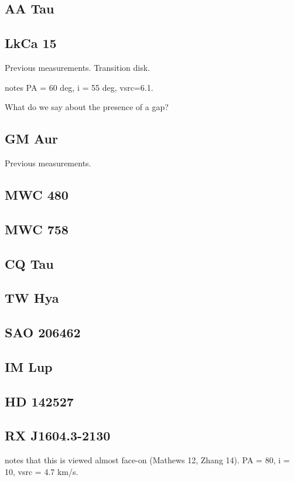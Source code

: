 \documentclass[twocolumn]{aastex6}
\begin{document}
\subsection{AA Tau}

\subsection{LkCa 15}
Previous measurements. Transition disk.

\citep{vandermarel15} notes PA = 60 deg, i = 55 deg,  vsrc=6.1.

What do we say about the presence of a gap?

\subsection{GM Aur}
Previous measurements.

\subsection{MWC 480}

\subsection{MWC 758}

\subsection{CQ Tau}

\subsection{TW Hya}

\subsection{SAO 206462}

\subsection{IM Lup}

\subsection{HD 142527}

\subsection{RX J1604.3-2130}
\citep{vandermarel15} notes that this is viewed almost face-on (Mathews 12, Zhang 14). PA = 80, i = 10, vsrc = 4.7 km/s.
\end{document}
